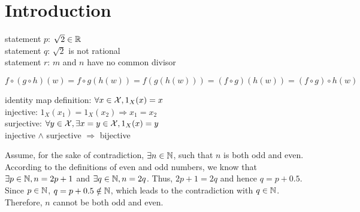 \chapter{Introduction}
\label{sec:introduction}

\exercise
\begin{center}
\end{center}

\exercise
\begin{center}
\end{center}

\exercise
statement $p$: $\sqrt{2} \in \mathbb{R}$ \\
statement $q$: $\sqrt{2}$ is not rational \\
statement $r$: $m$ and $n$ have no common divisor

\exercise
$f \circ (g \circ h)(w) = f \circ g(h(w)) = f(g(h(w))) = (f \circ g)(h(w))=(f \circ g) \circ h(w)$ \QED

\exercise
identity map definition: $\forall x \in \mathcal{X}, 1_X(x) = x$ \\
injective: $1_X(x_1) = 1_X(x_2) \Rightarrow x_1 = x_2$ \\
surjective: $\forall y \in \mathcal{X}, \exists x = y \in \mathcal{X}, 1_X(x) = y$ \\
injective $\wedge$ surjective $\Rightarrow$ bijective \QED

\problem
Assume, for the sake of contradiction, $\exists n \in \mathbb{N}$, such that $n$ is both odd and even. According to the definitions of even and odd numbers, we know that $\exists p \in \mathbb{N}, n = 2p+1$ and $\exists q \in \mathbb{N}, n = 2q$. Thus, $2p+1 = 2q$ and hence $q = p + 0.5$. Since $p \in \mathbb{N}$, $q = p + 0.5 \notin \mathbb{N}$, which leads to the contradiction with $q \in \mathbb{N}$. Therefore, $n$ cannot be both odd and even. \QED \\

